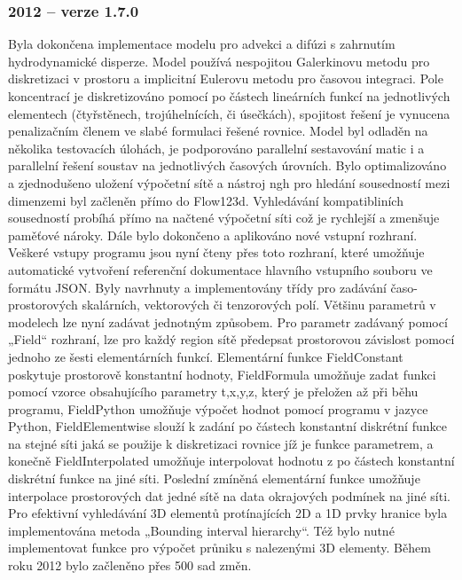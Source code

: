 \documentclass[11pt]{report}
\begin{document}
\subsubsection{2012 -- verze 1.7.0}
Byla dokončena implementace modelu pro advekci a difúzi s zahrnutím 
hydrodynamické disperze. Model používá nespojitou Galerkinovu metodu pro 
diskretizaci v prostoru a implicitní Eulerovu metodu pro časovou integraci.  
Pole koncentrací je diskretizováno pomocí po částech lineárních funkcí na 
jednotlivých elementech (čtyřstěnech, trojúhelnících, či úsečkách), spojitost 
řešení je vynucena penalizačním členem ve slabé formulaci řešené rovnice. Model 
byl odladěn na několika testovacích úlohách, je podporováno parallelní 
sestavování matic i a parallelní řešení soustav na jednotlivých časových 
úrovních.
Bylo optimalizováno a zjednodušeno uložení výpočetní sítě a nástroj ngh pro 
hledání sousedností mezi dimenzemi byl začleněn přímo do Flow123d. Vyhledávání 
kompatibliních sousedností probíhá přímo na načtené výpočetní síti což je 
rychlejší a zmenšuje paměťové nároky. 
Dále bylo dokončeno a aplikováno nové vstupní rozhraní. Veškeré vstupy programu 
jsou nyní čteny přes toto rozhraní, které umožňuje automatické vytvoření 
referenční dokumentace hlavního vstupního souboru ve formátu JSON.
Byly navrhnuty a implementovány třídy pro zadávání časo-prostorových skalárních, 
vektorových či tenzorových polí. Většinu parametrů v modelech lze nyní zadávat 
jednotným způsobem. Pro parametr zadávaný pomocí „Field“ rozhraní, lze pro každý 
region sítě předepsat prostorovou závislost pomocí jednoho ze šesti 
elementárních funkcí. Elementární funkce FieldConstant poskytuje prostorově 
konstantní hodnoty, FieldFormula umožňuje zadat funkci pomocí vzorce 
obsahujícího parametry t,x,y,z, který je přeložen až při běhu programu, 
FieldPython umožňuje výpočet hodnot pomocí programu v jazyce Python, 
FieldElementwise slouží k zadání po částech konstantní diskrétní funkce na 
stejné síti jaká se použije k diskretizaci rovnice jíž je funkce parametrem, a 
konečně FieldInterpolated umožňuje interpolovat hodnotu z po částech konstantní 
diskrétní funkce na jiné síti. 
Poslední zmíněná elementární funkce umožňuje interpolace prostorových dat jedné 
sítě na data okrajových podmínek na jiné síti. Pro efektivní vyhledávání 3D 
elementů protínajících 2D a 1D prvky hranice byla implementována metoda  
„Bounding interval hierarchy“. Též bylo nutné implementovat funkce pro výpočet 
průniku s nalezenými 3D elementy.
 Během roku 2012 bylo začleněno přes 500 sad změn. 
\end{document}
